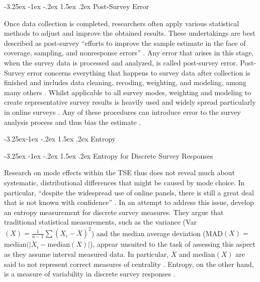 \documentclass[12pt,]{article}
\makeatletter
\renewcommand\subsubsection{\@startsection{subsubsection}{3}{\z@}
                                     {-3.25ex\@plus -1ex \@minus -.2ex}
                                     {1.5ex \@plus .2ex}
                                     {\normalsize\itshape}} %
\renewcommand\paragraph{\@startsection{paragraph}{4}{\z@}
                                    {-3.25ex \@plus -1ex \@minus -.2ex}
                                    {1.5ex \@plus .2ex}
                                    {\normalsize}} %
\makeatother
\begin{document}
\paragraph{Post-Survey Error}\label{mode-theory-types-post}

Once data collection is completed, researchers often apply various
statistical methods to adjust and improve the obtained results. These
undertakings are best described as post-survey ``efforts to improve the
sample estimate in the face of coverage, sampling, and nonresponse
errors'' \citep[p.~59]{groves_survey_2009}. Any error that arises in
this stage, when the survey data is processed and analyzed, is called
post-survey error. Post-Survey error concerns everything that happens to
survey data after collection is finished and includes data cleaning,
recoding, weighting, and modeling, among many others
\citep{weisberg_2005_total}. Whilst applicable to all survey modes,
weighting and modeling to create representative survey results is
heavily used and widely spread particularly in online surveys
\citep{atkeson_2014_nonresponse}. Any of these procedures can introduce
error to the survey analysis process and thus bias the estimate
\citep{mcnabb_2013_nonsampling}.

\subsubsection{Entropy}\label{mode-theory-entropy}

\paragraph{Entropy for Discrete Survey
Responses}\label{mode-theory-entropy-discrete}

Research on mode effects within the TSE thus does not reveal much about
systematic, distributional differences that might be caused by mode
choice. In particular, ``despite the widespread use of online panels,
there is still a great deal that is not known with confidence''
\citep[p.~54]{aapor_2010_opt-in}. In an attempt to address this issue,
\citet{homola_2016_measure} develop an entropy measurement
\citep{shannon_1948_mathematical} for discrete survey measures. They
argue that traditional statistical measurements, such as the variance
(Var\((X) = \frac{1}{n-1} \sum (X_i - \overline{X})^2\)) and the median
average deviation
(MAD\((X) =\)median\((\vert X_i -\)median\((X)\vert\)), appear unsuited
to the task of assessing this aspect as they assume interval measured
data. In particular, \(\overline{X}\) and median\((X)\) are said to not
represent correct measures of centrality
\citep{homola_2016_measure, wang_2008_probability, hu_2010_information}.
Entropy, on the other hand, is a measure of variability in discrete
survey responses \citep{shannon_1948_mathematical}.
\end{document}
